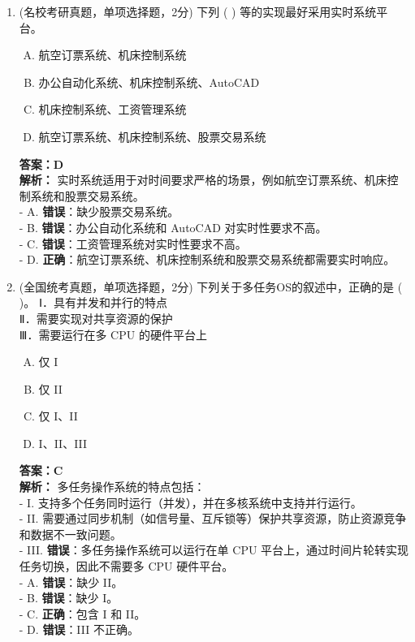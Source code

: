 \documentclass[lang=cn,newtx,10pt,scheme=chinese]{../../elegantbook}
\begin{document}
\begin{enumerate}
\item (名校考研真题，单项选择题，2分) 下列 (    ) 等的实现最好采用实时系统平台。
    \begin{enumerate}[A.]
        \item 航空订票系统、机床控制系统
        \item 办公自动化系统、机床控制系统、AutoCAD
        \item 机床控制系统、工资管理系统
        \item 航空订票系统、机床控制系统、股票交易系统
    \end{enumerate}
    \textbf{答案：D}\\
    \textbf{解析：} 实时系统适用于对时间要求严格的场景，例如航空订票系统、机床控制系统和股票交易系统。\\
    - A. \textbf{错误}：缺少股票交易系统。\\
    - B. \textbf{错误}：办公自动化系统和 AutoCAD 对实时性要求不高。\\
    - C. \textbf{错误}：工资管理系统对实时性要求不高。\\
    - D. \textbf{正确}：航空订票系统、机床控制系统和股票交易系统都需要实时响应。\\

    \item (全国统考真题，单项选择题，2分) 下列关于多任务OS的叙述中，正确的是 (    )。
    Ⅰ．具有并发和并行的特点\\
    Ⅱ．需要实现对共享资源的保护\\
    Ⅲ．需要运行在多 CPU 的硬件平台上\\
    \begin{enumerate}[A.]
        \item 仅 I
        \item 仅 II
        \item 仅 I、II
        \item I、II、III
    \end{enumerate}
    \textbf{答案：C}\\
    \textbf{解析：} 多任务操作系统的特点包括：\\
    - I. 支持多个任务同时运行（并发），并在多核系统中支持并行运行。\\
    - II. 需要通过同步机制（如信号量、互斥锁等）保护共享资源，防止资源竞争和数据不一致问题。\\
    - III. \textbf{错误}：多任务操作系统可以运行在单 CPU 平台上，通过时间片轮转实现任务切换，因此不需要多 CPU 硬件平台。\\
    - A. \textbf{错误}：缺少 II。\\
    - B. \textbf{错误}：缺少 I。\\
    - C. \textbf{正确}：包含 I 和 II。\\
    - D. \textbf{错误}：III 不正确。\\


\end{enumerate}
\end{document}
